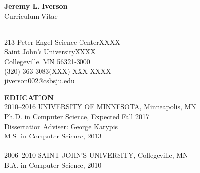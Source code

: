 \documentclass[a4paper,12pt]{article}
\newcommand{\lskip}[1]{\hspace*{1em}\\[#1\baselineskip]}
\begin{document}
\begin{center}
{\large\textbf{Jeremy L. Iverson}}\\
Curriculum Vitae\\
\end{center}
%
\lskip{-3}
%
213 Peter Engel Science Center\hfill XXXX\\
Saint John's University\hfill XXXX\\
Collegeville, MN 56321-3000\hfill\\ %
(320) 363-3083\hfill (XXX) XXX-XXXX\\ %
jiverson002@csbsju.edu


\textbf{EDUCATION}
\lskip{1}
%
2010--2016  \tabto{7em}UNIVERSITY OF MINNESOTA, Minneapolis, MN\\
            \tabto{7em}Ph.D. in Computer Science, Expected Fall 2017\\
            \tabto{8em}Dissertation Adviser: George Karypis\\
            \tabto{7em}M.S. in Computer Science, 2013\\
%
\lskip{0}
%
2006--2010  \tabto{7em}SAINT JOHN'S UNIVERSITY, Collegeville, MN\\
            \tabto{7em}B.A. in Computer Science, 2010
\end{document}

